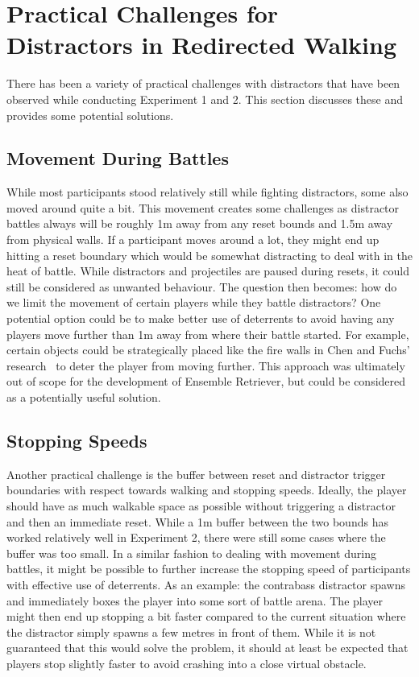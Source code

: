 \section{Practical Challenges for Distractors in Redirected Walking}
There has been a variety of practical challenges with distractors that have been observed while conducting Experiment 1 and 2. This section discusses these and provides some potential solutions. 

\subsection{Movement During Battles}
While most participants stood relatively still while fighting distractors, some also moved around quite a bit. This movement creates some challenges as distractor battles always will be roughly 1m away from any reset bounds and 1.5m away from physical walls. If a participant moves around a lot, they might end up hitting a reset boundary which would be somewhat distracting to deal with in the heat of battle. While distractors and projectiles are paused during resets, it could still be considered as unwanted behaviour. The question then becomes: how do we limit the movement of certain players while they battle distractors? One potential option could be to make better use of deterrents to avoid having any players move further than 1m away from where their battle started. For example, certain objects could be strategically placed like the fire walls in Chen and Fuchs' research~\cite{chen2017towards, chen2017supporting} to deter the player from moving further. This approach was ultimately out of scope for the development of Ensemble Retriever, but could be considered as a potentially useful solution.  

\subsection{Stopping Speeds}
Another practical challenge is the buffer between reset and distractor trigger boundaries with respect towards walking and stopping speeds. Ideally, the player should have as much walkable space as possible without triggering a distractor and then an immediate reset. While a 1m buffer between the two bounds has worked relatively well in Experiment 2, there were still some cases where the buffer was too small. In a similar fashion to dealing with movement during battles, it might be possible to further increase the stopping speed of participants with effective use of deterrents. As an example: the contrabass distractor spawns and immediately boxes the player into some sort of battle arena. The player might then end up stopping a bit faster compared to the current situation where the distractor simply spawns a few metres in front of them. While it is not guaranteed that this would solve the problem, it should at least be expected that players stop slightly faster to avoid crashing into a close virtual obstacle.

